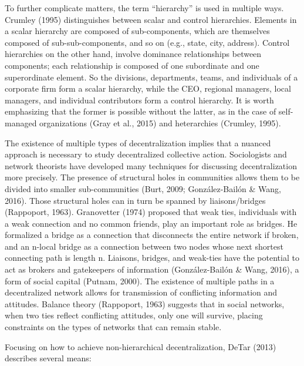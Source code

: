 To further complicate matters, the term ``hierarchy'' is used in multiple ways. Crumley (1995) distinguishes between scalar and control hierarchies. Elements in a scalar hierarchy are composed of sub-components, which are themselves composed of sub-sub-components, and so on (e.g., state, city, address). Control hierarchies on the other hand, involve dominance relationships between components; each relationship is composed of one subordinate and one superordinate element. So the divisions, departments, teams, and individuals of a corporate firm form a scalar hierarchy, while the CEO, regional managers, local managers, and individual contributors form a control hierarchy. It is worth emphasizing that the former is possible without the latter, as in the case of self-managed organizations (Gray et al., 2015) and heterarchies (Crumley, 1995).

The existence of multiple types of decentralization implies that a nuanced approach is necessary to study decentralized collective action. Sociologists and network theorists have developed many techniques for discussing decentralization more precisely. The presence of structural holes in communities allows them to be divided into smaller sub-communities (Burt, 2009; Gonz\'alez-Bail\'on \& Wang, 2016). Those structural holes can in turn be spanned by liaisons/bridges (Rappoport, 1963). Granovetter (1974) proposed that weak ties, individuals with a weak connection and no common friends, play an important role as bridges. He formalized a bridge as a connection that disconnects the entire network if broken, and an n-local bridge as a connection between two nodes whose next shortest connecting path is length n. Liaisons, bridges, and weak-ties have the potential to act as brokers and gatekeepers of information (Gonz\'alez-Bail\'on \& Wang, 2016), a form of social capital (Putnam, 2000). The existence of multiple paths in a decentralized network allows for transmission of conflicting information and attitudes. Balance theory (Rappoport, 1963) suggests that in social networks, when two ties reflect conflicting attitudes, only one will survive, placing constraints on the types of networks that can remain stable.

Focusing on how to achieve non-hierarchical decentralization, DeTar (2013) describes several means:

